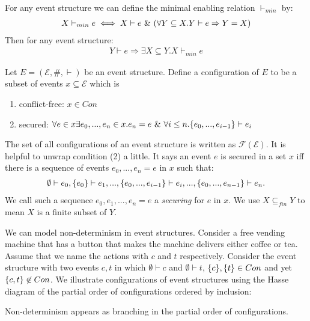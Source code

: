 \documentclass{article}
\begin{document}
\begin{notion}
    For any event structure we can define the minimal enabling relation $\vdash_{min}$ by:
    \begin{align*}
        X \vdash_{min} e \iff X \vdash e \ \& \ 
        ( \forall Y \subseteq X . Y \vdash e \Rightarrow Y = X )
    \end{align*}
    Then for any event structure:
    \begin{align*}
        Y \vdash e \Rightarrow \exists X \subseteq Y . X \vdash_{min} e
    \end{align*}
\end{notion}

\begin{definition}[Configuration]
    \label{conf}
    Let $E = (\mathcal{E},\#,\vdash)$ be an event structure.
    Define a configuration of $E$ to be a subset of events $x \subseteq \mathcal{E}$ which is
    \begin{enumerate}
        \item conflict-free: $x \in Con$
        \item secured: $\forall e \in x \exists e_0,...,e_n \in x. e_n = e \ \& \
                  \forall i \leq n. \{e_0,...,e_{i-1}\} \vdash e_i$
    \end{enumerate}
\end{definition}
The set of all configurations of an event structure is written as $\mathcal{F(E)}$.
It is helpful to unwrap condition (2) a little. It says an event $e$ is secured in a set $x$
iff there is a sequence of events $e_0,...,e_n = e$ in $x$ such that:
\begin{align*}
    \emptyset \vdash e_0, \{e_0\} \vdash e_1, ..., \{e_0,...,e_{i-1}\} \vdash e_i,...,
    \{e_0,...,e_{n-1}\} \vdash e_n.
\end{align*}
We call such a sequence $e_0,e_1,...,e_n = e$ a \emph{securing} for $e$ in $x$.
We use $X \subseteq_{fin} Y$ to mean $X$ is a finite subset of $Y$.

\begin{example}
    We can model non-determinism in event structures.
    Consider a free vending machine that has a button that makes
    the machine delivers either coffee or tea. 
    Assume that we name the actions with $c$ and $t$ respectively.
    Consider the event structure with two events $c,t$ in which
    $\emptyset \vdash c$ and $\emptyset \vdash t$,
    $\{c\},\{t\} \in Con$ and yet $\{c,t\} \not \in Con$.
    We illustrate configurations of event structures using the Hasse diagram of
    the partial order of configurations ordered by inclusion:
    \begin{center}
    \end{center}
    Non-determinism appears as branching in the partial order of configurations.
\end{example}
\end{document}
